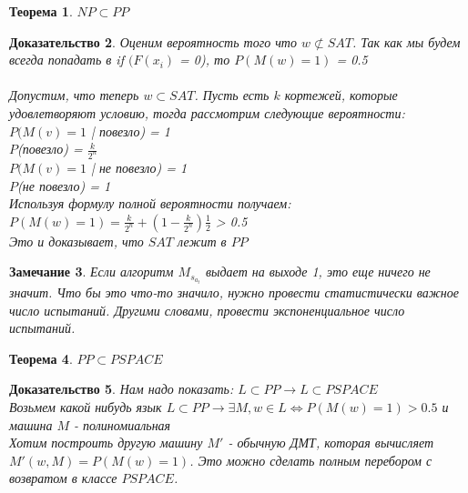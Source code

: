 \documentclass{beamer}
\theoremstyle{plain}
\newtheorem{thm}{Теорема}
\newtheorem{rmk}[thm]{Замечание}
\newtheorem{proof-rus}[thm]{Доказательство}
\theoremstyle{definition}
\begin{document}
\begin{frame}
    \begin{thm}
    $ NP \subset PP $
    \end{thm}
    \begin{proof-rus}
    Оценим вероятность того что $ w \not\subset SAT $. Так как мы будем всегда попадать в if $(F(x_i)$ = 0), то $P(M(w)=1)$ = 0.5 \\
    \\
    Допустим, что теперь $ w \subset SAT $.
    Пусть есть $k$ кортежей, которые удовлетворяют условию, тогда 
    рассмотрим следующие вероятности: \\
    $ P(M(v)=1$ | повезло) = 1  \\
    $ P $(повезло) = $\frac{k}{2^n} $ \\
    $ P(M(v)=1$ | не повезло) = 1 \\
    $ P $(не повезло) = 1 \\
    Используя формулу полной вероятности получаем: \\
    $ P(M(w)=1) = \frac{k}{2^n} + (1 - \frac{k}{2^n})\frac{1}{2}$ > 0.5 \\
    Это и доказывает, что $SAT$ лежит в $PP$
    \end {proof-rus}
    
\end{frame}

\begin{frame}
    \begin{rmk}
    Если алгоритм $M_s_a_t$ выдает на выходе 1, это еще ничего не значит. Что бы это что-то значило, нужно провести статистически важное число испытаний. Другими словами, провести экспоненциальное число испытаний.
    \end{rmk}
    \begin{thm}
    $ PP \subset PSPACE $
    \end{thm}
    \begin{proof-rus}
    Нам надо показать: $ L \subset  PP \rightarrow L \subset  PSPACE $\\
    Возьмем какой нибудь язык $ L \subset PP \rightarrow \exists M, w \in L \Leftrightarrow P(M(w)=1)>0.5$ и машина $M$ - полиномиальная \\
    Хотим построить другую машину $M'$ - обычную ДМТ, которая вычисляет $ M'(w, M) = P(M(w)=1)$. Это можно сделать полным перебором с возвратом в классе $PSPACE$.
    \end{proof-rus}
\end{frame}
\end{document}
